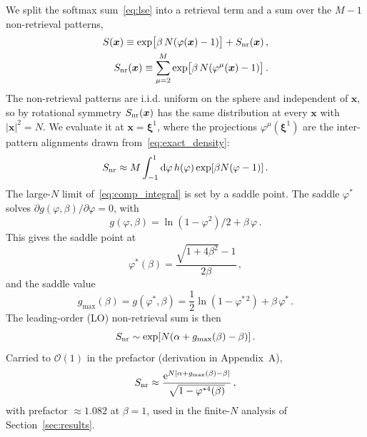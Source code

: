 \documentclass[letterpaper]{article} %
\newcommand{\bxi}{\boldsymbol{\xi}}
\newcommand{\bx}{\bm{x}}
\newcommand{\e}{{\mathrm{e}}}
\newcommand{\dd}{{\mathrm{d}}}
\newcommand{\Bnet}{\beta}
\newcommand{\p}{\partial}
\begin{document}
We split the softmax sum~\eqref{eq:lse} into a retrieval term and a sum over the $M-1$ non-retrieval patterns,
\begin{align}
S(\bx) \equiv \exp\!\big[\Bnet\,N (\varphi(\bx) - 1)\big] + S_{\rm nr}(\bx)\,,
\label{eq:softmax_sum}\\
S_{\rm nr}(\bx) \equiv \sum_{\mu=2}^{M} \exp\!\big[\Bnet\,N (\varphi^\mu(\bx) - 1)\big]\,.
\label{eq:comp_sum}
\end{align}
The non-retrieval patterns are i.i.d. uniform on the sphere and independent of $\bm x$, so by rotational symmetry $S_{\rm nr}(\bm x)$ has the same distribution at every $\bm x$ with $|\bm x|^2 = N$. We evaluate it at $\bm x = \bxi^1$, where the projections $\varphi^\mu(\bxi^1)$ are the inter-pattern alignments drawn from~\eqref{eq:exact_density}:
\begin{equation}
    S_{\rm nr} \approx M \int_{-1}^{1} \dd\varphi\, h(\varphi) \exp[\Bnet N(\varphi - 1)]\,.
    \label{eq:comp_integral}
\end{equation}
The large-$N$ limit of~\eqref{eq:comp_integral} is set by a saddle point. The
saddle $\varphi^*$ solves $\p g(\varphi, \Bnet)/\p\varphi = 0$, with
\begin{equation}
    g(\varphi, \Bnet) = \ln(1-\varphi^2)/2 + \Bnet\,\varphi\,.
\end{equation}
This gives the saddle point at
\begin{equation}
\varphi^*(\Bnet) = \frac{\sqrt{1+4\Bnet^2} - 1}{2\Bnet}\,,
\label{eq:saddle}
\end{equation}
and the saddle value
\begin{equation}
g_{\max}(\Bnet) = g(\varphi^*, \Bnet) = \frac12 \ln(1 - \varphi^{*\,2}) + \Bnet\,\varphi^*\,.
\label{eq:saddle_value}
\end{equation}
The leading-order (LO) non-retrieval sum is then
\begin{equation}
    S_{\rm nr} \sim \exp[N(\alpha + g_{\max}(\Bnet) - \Bnet)]\,.
    \label{eq:comp_saddle}
\end{equation}
Carried to $\mathcal{O}(1)$ in the prefactor (derivation in Appendix~A),
\begin{equation}
    S_{\rm nr} \approx \frac{\e^{N[\alpha + g_{\max}(\Bnet) - \Bnet]}}{\sqrt{1-\varphi^{*4}(\Bnet)}}\,,
    \label{eq:comp_laplace}
\end{equation}
with prefactor $\approx 1.082$ at $\Bnet = 1$, used in the finite-$N$ analysis of Section~\ref{sec:results}.
\end{document}
